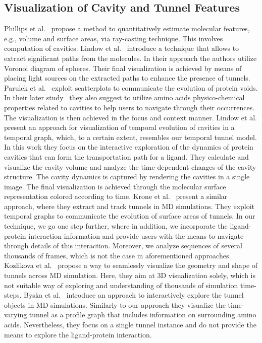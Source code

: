 \documentclass[twocolumn]{bmcart}%
\begin{document}
\subsection{Visualization of Cavity and Tunnel Features}
Phillips et al.~\cite{phillips2010} propose a method to quantitatively estimate molecular features, e.g., volume and surface areas, via ray-casting technique. This involves computation of cavities.
Lindow et al.~\cite{LindowBH11} introduce a technique that allows to extract significant paths from the molecules. 
In their approach the authors utilize Voronoi diagram of spheres. 
Their final visualization is achieved by means of placing light sources on the extracted paths to enhance the presence of tunnels.
Parulek et al.~\cite{parulek2012} exploit scatterplots to communicate the evolution of protein voids. 
In their later study~\cite{parulek2013} they also suggest to utilize amino acids physico-chemical properties related to cavities to help users to navigate through their occurrences. 
The visualization is then achieved in the focus and context manner.
Lindow et al. \cite{Lindow2013} present an approach for visualization of temporal evolution of cavities in a temporal graph, which, to a certain extent, resembles our temporal tunnel model. 
In this work they focus on the interactive exploration of the dynamics of protein cavities that can form the transportation path for a ligand. 
They calculate and visualize the cavity volume and analyze the time-dependent changes of the cavity structure.
The cavity dynamics is captured by rendering the cavities in a single image. 
The final visualization is achieved through the molecular surface representation colored according to time. 
Krone et al.~\cite{krone2013features} present a similar approach, where they extract and track tunnels in MD simulations. They exploit temporal graphs to communicate the evolution of surface areas of tunnels. In our technique, we go one step further, where in addition, we incorporate the ligand-protein interaction information and provide users with the means to navigate through details of this interaction. Moreover, we analyze sequences of several thousands of frames, which is not the case in aforementioned approaches.
Kozlikova et al.~\cite{kozlikova2014vcbm} propose a way to seamlessly visualize the geometry and shape of tunnels across MD simulation. Here, they aim at 3D visualization solely, which is not suitable way of exploring and understanding of thousands of simulation time-steps.
Byska et al.~\cite{byska2016} introduce an approach to interactively explore the tunnel objects in MD simulations. Similarly to our approach they visualize the time-varying tunnel as a profile graph that includes information on surrounding amino acids. Nevertheless, they focus on a single tunnel instance and do not provide the means to explore the ligand-protein interaction.
\end{document}
